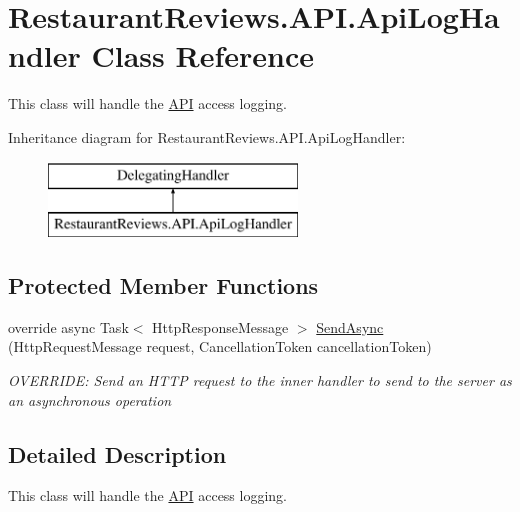\hypertarget{class_restaurant_reviews_1_1_a_p_i_1_1_api_log_handler}{}\section{Restaurant\+Reviews.\+A\+P\+I.\+Api\+Log\+Handler Class Reference}
\label{class_restaurant_reviews_1_1_a_p_i_1_1_api_log_handler}


This class will handle the \hyperlink{namespace_restaurant_reviews_1_1_a_p_i}{A\+PI} access logging.  


Inheritance diagram for Restaurant\+Reviews.\+A\+P\+I.\+Api\+Log\+Handler\+:\begin{figure}[H]
\begin{center}
\leavevmode
\includegraphics[height=2.000000cm]{class_restaurant_reviews_1_1_a_p_i_1_1_api_log_handler}
\end{center}
\end{figure}
\subsection*{Protected Member Functions}
\begin{DoxyCompactItemize}
\item 
override async Task$<$ Http\+Response\+Message $>$ \hyperlink{class_restaurant_reviews_1_1_a_p_i_1_1_api_log_handler_a720fedc6cb9488fd49afa792f6b2726d}{Send\+Async} (Http\+Request\+Message request, Cancellation\+Token cancellation\+Token)
\begin{DoxyCompactList}\small\item\em O\+V\+E\+R\+R\+I\+DE\+: Send an H\+T\+TP request to the inner handler to send to the server as an asynchronous operation \end{DoxyCompactList}\end{DoxyCompactItemize}


\subsection{Detailed Description}
This class will handle the \hyperlink{namespace_restaurant_reviews_1_1_a_p_i}{A\+PI} access logging. 



